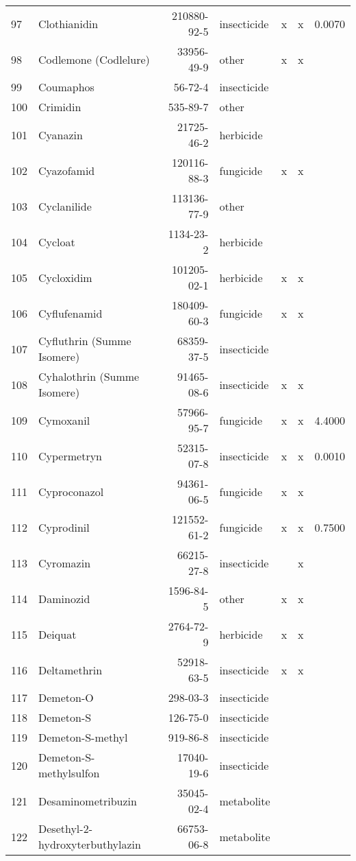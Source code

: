 \begin{longtable}{lp{4cm}rlp{1.3cm}p{1.3cm}p{1.5cm}}
  97 & Clothianidin & 210880-92-5 & insecticide & x & x & 0.0070 \\ 
  98 & Codlemone (Codlelure) & 33956-49-9 & other & x & x &  \\ 
  99 & Coumaphos & 56-72-4 & insecticide &  &  &  \\ 
  100 & Crimidin & 535-89-7 & other &  &  &  \\ 
  101 & Cyanazin & 21725-46-2 & herbicide &  &  &  \\ 
  102 & Cyazofamid & 120116-88-3 & fungicide & x & x &  \\ 
  103 & Cyclanilide & 113136-77-9 & other &  &  &  \\ 
  104 & Cycloat & 1134-23-2 & herbicide &  &  &  \\ 
  105 & Cycloxidim & 101205-02-1 & herbicide & x & x &  \\ 
  106 & Cyflufenamid & 180409-60-3 & fungicide & x & x &  \\ 
  107 & Cyfluthrin (Summe Isomere) & 68359-37-5 & insecticide &  &  &  \\ 
  108 & Cyhalothrin (Summe Isomere) & 91465-08-6 & insecticide & x & x &  \\ 
  109 & Cymoxanil & 57966-95-7 & fungicide & x & x & 4.4000 \\ 
  110 & Cypermetryn & 52315-07-8 & insecticide & x & x & 0.0010 \\ 
  111 & Cyproconazol & 94361-06-5 & fungicide & x & x &  \\ 
  112 & Cyprodinil & 121552-61-2 & fungicide & x & x & 0.7500 \\ 
  113 & Cyromazin & 66215-27-8 & insecticide &  & x &  \\ 
  114 & Daminozid & 1596-84-5 & other & x & x &  \\ 
  115 & Deiquat & 2764-72-9 & herbicide & x & x &  \\ 
  116 & Deltamethrin & 52918-63-5 & insecticide & x & x &  \\ 
  117 & Demeton-O & 298-03-3 & insecticide &  &  &  \\ 
  118 & Demeton-S & 126-75-0 & insecticide &  &  &  \\ 
  119 & Demeton-S-methyl & 919-86-8 & insecticide &  &  &  \\ 
  120 & Demeton-S-methylsulfon & 17040-19-6 & insecticide &  &  &  \\ 
  121 & Desaminometribuzin & 35045-02-4 & metabolite &  &  &  \\ 
  122 & Desethyl-2-hydroxyterbuthylazin & 66753-06-8 & metabolite &  &  &  \\ 

\end{longtable}
